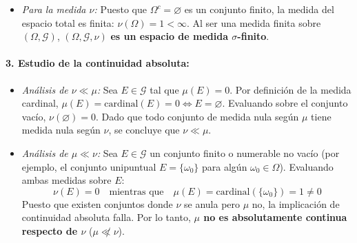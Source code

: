 \begin{problema}
\begin{itemize}
    \item \textit{Para la medida $\nu$:}
    Puesto que $\Omega^c = \varnothing$ es un conjunto finito, la medida del espacio total es finita: $\nu(\Omega) = 1 < \infty$. Al ser una medida finita sobre $(\Omega, \mathcal{G})$, $(\Omega, \mathcal{G}, \nu)$ \textbf{es un espacio de medida $\sigma$-finito}.
\end{itemize}

\paragraph{3. Estudio de la continuidad absoluta:}
\begin{itemize}
    \item \textit{Análisis de $\nu \ll \mu$:}
    Sea $E \in \mathcal{G}$ tal que $\mu(E) = 0$. Por definición de la medida cardinal, $\mu(E) = \text{cardinal}(E) = 0 \iff E = \varnothing$. Evaluando sobre el conjunto vacío, $\nu(\varnothing) = 0$. Dado que todo conjunto de medida nula según $\mu$ tiene medida nula según $\nu$, se concluye que \textbf{$\nu \ll \mu$}.

    \item \textit{Análisis de $\mu \ll \nu$:}
    Sea $E \in \mathcal{G}$ un conjunto finito o numerable no vacío (por ejemplo, el conjunto unipuntual $E = \{\omega_0\}$ para algún $\omega_0 \in \Omega$). Evaluando ambas medidas sobre $E$:
    \[
        \nu(E) = 0 \quad \text{mientras que} \quad \mu(E) = \text{cardinal}(\{\omega_0\}) = 1 \neq 0
    \]
    Puesto que existen conjuntos donde $\nu$ se anula pero $\mu$ no, la implicación de continuidad absoluta falla. Por lo tanto, \textbf{$\mu$ no es absolutamente continua respecto de $\nu$} ($\mu \not\ll \nu$).
\end{itemize}
\end{problema}